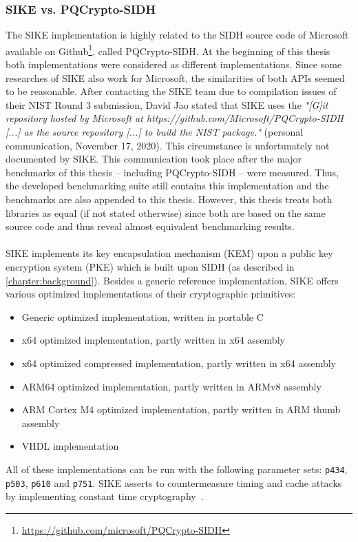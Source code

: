 \subsubsection{SIKE vs. PQCrypto-SIDH}\label{existing:sike_vs_pqcrypto}
The \gls{SIKE} implementation is highly related to the \gls{SIDH} source code of Microsoft available on Github\footnote{\url{https://github.com/microsoft/PQCrypto-SIDH}}, called \gls{PQCrypto-SIDH}. At the beginning of this thesis both implementations were considered as different implementations. Since some researches of \gls{SIKE} also work for Microsoft, the similarities of both APIs seemed to be reasonable. After contacting the \gls{SIKE} team due to compilation issues of their NIST Round 3 submission, David Jao stated that \gls{SIKE} uses the \textit{"[G]it repository hosted by Microsoft at
https://github.com/Microsoft/PQCrypto-SIDH [...] as the source
repository [...] to build the NIST package."} (personal communication, November 17, 2020). This circumstance is unfortunately not documented by \gls{SIKE}. This communication took place after the major benchmarks of this thesis -- including \gls{PQCrypto-SIDH} -- were measured. Thus, the developed benchmarking suite still contains this implementation and the benchmarks are also appended to this thesis. However, this thesis treats both libraries as equal (if not stated otherwise) since both are based on the same source code and thus reveal almost equivalent benchmarking results.
\\\\
\gls{SIKE} implements its key encapsulation mechanism (\gls{KEM}) upon a public key encryption system (\gls{PKE}) which is built upon \gls{SIDH} (as described in \autoref{chapter:background}). Besides a generic reference implementation, \gls{SIKE} offers various optimized implementations of their cryptographic primitives:
\begin{itemize}
  \item Generic optimized implementation, written in portable C
  \item x64 optimized implementation, partly written in x64 assembly
  \item x64 optimized compressed implementation, partly written in x64 assembly
  \item ARM64 optimized implementation, partly written in ARMv8 assembly
  \item ARM Cortex M4 optimized implementation, partly written in ARM thumb assembly
  \item VHDL implementation
\end{itemize}
All of these implementations can be run with the following parameter sets: \texttt{p434}, \texttt{p503}, \texttt{p610} and \texttt{p751}. \gls{SIKE} asserts to countermeasure timing and cache attacks by implementing constant time cryptography~\parencite{sike2020spec}.

